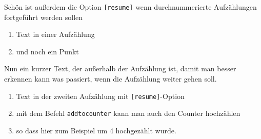 Schön ist außerdem die Option \texttt{[resume]} wenn durchnummerierte Aufzählungen
fortgeführt werden sollen
\begin{enumerate}
	\item Text in einer Aufzählung

	\item und noch ein Punkt
\end{enumerate}
%
Nun ein kurzer Text, der außerhalb der Aufzählung ist, damit man besser erkennen
kann was passiert, wenn die Aufzählung weiter gehen soll.
%
\begin{enumerate}[resume]
	\item Text in der zweiten Aufzählung mit \texttt{[resume]}-Option

	\item mit dem Befehl \texttt{addtocounter} kann man auch den Counter
		hochzählen
		\addtocounter{enumi}{4}

	\item so dass hier zum Beispiel um 4 hochgezählt wurde.
\end{enumerate}
